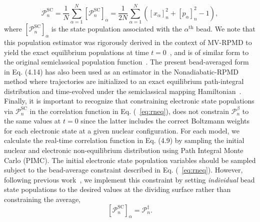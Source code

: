 \documentclass[phd,tocprelim]{cornell}
\begin{document}
\begin{equation}
\label{eq:scpop}
\mathcal{P}_n^{\textrm{SC}}=
\frac{1}{N} \sum_{\alpha=1}^{N} 
\left[\mathcal P_n^\textrm{SC}\right]_\alpha 
= 
\frac{1}{2N} \sum_{\alpha=1}^{N} 
(\left[x_{\alpha}\right]_n^2+ \left[p_{\alpha}\right]_n^2 -1),
\end{equation}
where $\left[ \mathcal P_n^\textrm{SC} \right]_\alpha$
is the state population associated with 
the $\alpha^\textrm{th}$ bead.
We note that this population estimator was rigorously
derived in the context of MV-RPMD to yield the exact
equilibrium populations at time $t=0$~\cite{hel16}, 
and is of similar form to the original semiclassical population
function~\cite{HMWM1979,GSMT1997}. 
The present 
bead-averaged form in Eq. (4.14)%
has also been used as an estimator in the 
Nonadiabatic-RPMD method where trajectories are initialized
to an exact equilibrium path-integral distribution and time-evolved 
under the semiclassical mapping Hamiltonian~\cite{ric2017}.
Finally, it is important to recognize that constraining electronic 
state populations via $\mathcal{P}^\textrm{SC}_n$
in the correlation function in Eq. (~\ref{eq:rneq}),
does not constrain $\mathcal{P}^\beta_n$ to the
same values at $t=0$ since the latter includes
the correct Boltzmann weights for each electronic 
state at a given nuclear configuration.
For each model, we calculate the real-time
correlation function in Eq. (4.9) %
by sampling the initial nuclear and electronic 
non-equilibrium distribution using Path Integral 
Monte Carlo (PIMC).
The initial electronic state population variables
should be sampled subject to the bead-average 
constraint described in Eq. (~\ref{eq:rneq}).
However, following previous work~\cite{NA2015}, 
we implement this constraint 
by setting \emph{individual} bead state populations
to the desired values at the dividing surface rather
than constraining the average,
\begin{equation}
\left[\mathcal{P}_n^\textrm{SC}\right]_\alpha = 
\mathcal{P}_n^\ddag.
    \label{eq:pop_init}
\end{equation}
\end{document}

